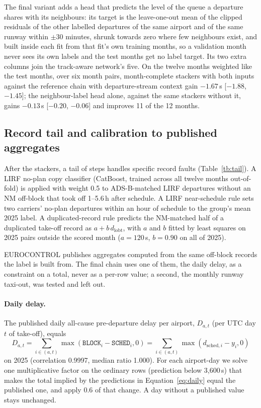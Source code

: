 \documentclass[
  manuscript=article,
  layout=preprint,
  year=2026,
  volume=x,
]{extra/joas}
\newcommand{\fld}[1]{\texttt{#1}}
\begin{document}
The final variant adds a head that predicts the level of the queue a departure shares with its neighbours: its target is the
leave-one-out mean of the clipped residuals of the other labelled departures of the same airport and of the same runway within $\pm 30$ minutes,
shrunk towards zero where few neighbours exist, and built inside each fit from that fit's own training months, so a validation month never sees its
own labels and the test months get no label target. Its two extra columns join the track-aware network's five. On the twelve months weighted like the test months, over six month
pairs, month-complete stackers with both inputs against the reference chain with departure-stream context gain $-1.67$\,s [$-1.88$, $-1.45$]; the neighbour-label head alone, against the same
stackers without it, gains $-0.13$\,s [$-0.20$, $-0.06$] and improves 11 of the 12 months.

\subsection{Record tail and calibration to published aggregates}
\label{sec:calibration}

After the stackers, a tail of steps handles specific record faults (Table~\ref{tb:tail}). A LIRF no-plan copy classifier (CatBoost,
trained across all twelve months out-of-fold) is applied with weight 0.5 to ADS-B-matched LIRF departures without an NM off-block that
took off 1--5.6\,h after schedule. A LIRF near-schedule rule sets two carriers' no-plan departures within an hour of schedule to the
group's mean 2025 label. A duplicated-record rule predicts the NM-matched half of a duplicated take-off record as $a + b\,d_{\mathrm{lobt}}$,
with $a$ and $b$ fitted by least squares on 2025 pairs outside the scored month ($a = 120$\,s, $b = 0.90$ on all of 2025).

EUROCONTROL publishes aggregates computed from the same off-block records the label is built from. The final chain uses one of them,
the daily delay, as a constraint on a total, never as a per-row value; a second, the monthly runway taxi-out, was tested and left out.

\paragraph{Daily delay.} The published daily all-cause pre-departure delay per airport, $D_{a,t}$ (per UTC day $t$ of take-off), equals
\begin{equation} \label{eq:daily}
D_{a,t} = \sum_{i \in (a,t)} \max(\fld{BLOCK}_i - \fld{SCHED}_i, 0) = \sum_{i \in (a,t)} \max(d_{\mathrm{sched},i} - y_i, 0)
\end{equation}
on 2025 (correlation 0.9997, median ratio 1.000). For each airport-day we solve one multiplicative factor on the ordinary rows (prediction below
3,600\,s) that makes the total implied by the predictions in Equation~\ref{eq:daily} equal the published one, and apply 0.6 of that
change. A day without a published value stays unchanged.
\end{document}

